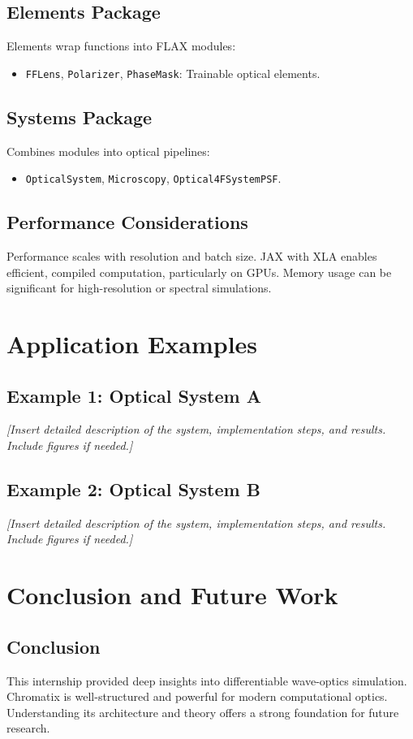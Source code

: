 \documentclass[a4paper,12pt]{report}
\begin{document}
\section{Elements Package}
Elements wrap functions into FLAX modules:
\begin{itemize}
    \item \texttt{FFLens}, \texttt{Polarizer}, \texttt{PhaseMask}: Trainable optical elements.
\end{itemize}

\section{Systems Package}
Combines modules into optical pipelines:
\begin{itemize}
    \item \texttt{OpticalSystem}, \texttt{Microscopy}, \texttt{Optical4FSystemPSF}.
\end{itemize}

\section{Performance Considerations}
Performance scales with resolution and batch size. JAX with XLA enables efficient, compiled computation, particularly on GPUs. Memory usage can be significant for high-resolution or spectral simulations.

\chapter{Application Examples}
\section{Example 1: Optical System A}
\textit{[Insert detailed description of the system, implementation steps, and results. Include figures if needed.]}

\section{Example 2: Optical System B}
\textit{[Insert detailed description of the system, implementation steps, and results. Include figures if needed.]}

\chapter{Conclusion and Future Work}
\section{Conclusion}
This internship provided deep insights into differentiable wave-optics simulation. Chromatix is well-structured and powerful for modern computational optics. Understanding its architecture and theory offers a strong foundation for future research.
\end{document}
